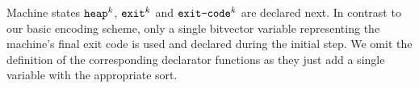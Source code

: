 



%






\noindent
Machine states $\texttt{heap}^k$, $\texttt{exit}^k$ and $\texttt{exit-code}^k$ are declared next.
In contrast to our basic encoding scheme, only a single bitvector variable representing the machine's final exit code is used and declared during the initial step.
We omit the definition of the corresponding declarator functions as they just add a single variable with the appropriate sort.

